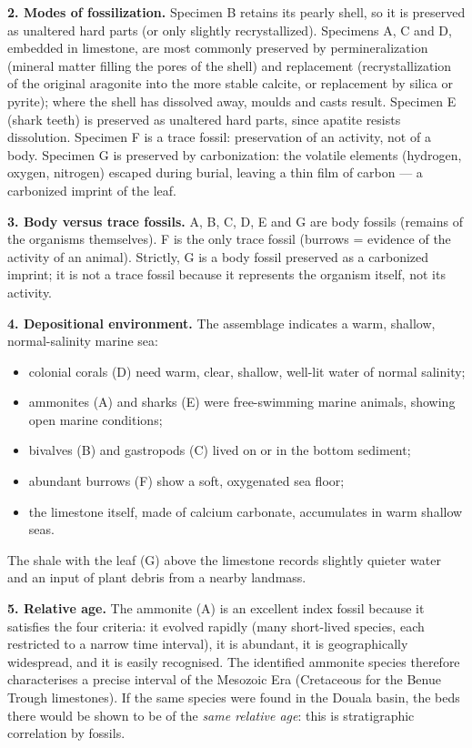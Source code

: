 \documentclass[11pt]{article}
\newcommand{\cle}[1]{{\popxbold\color{popdark}#1}}
\begin{document}
\textbf{2. Modes of fossilization.} Specimen B retains its pearly shell, so it is preserved as \cle{unaltered hard parts} (or only slightly recrystallized). Specimens A, C and D, embedded in limestone, are most commonly preserved by \cle{permineralization} (mineral matter filling the pores of the shell) and \cle{replacement} (recrystallization of the original aragonite into the more stable calcite, or replacement by silica or pyrite); where the shell has dissolved away, \cle{moulds and casts} result. Specimen E (shark teeth) is preserved as unaltered hard parts, since apatite resists dissolution. Specimen F is a \cle{trace fossil}: preservation of an activity, not of a body. Specimen G is preserved by \cle{carbonization}: the volatile elements (hydrogen, oxygen, nitrogen) escaped during burial, leaving a thin film of carbon --- a carbonized imprint of the leaf.

\textbf{3. Body versus trace fossils.} A, B, C, D, E and G are \cle{body fossils} (remains of the organisms themselves). F is the only \cle{trace fossil} (burrows = evidence of the activity of an animal). Strictly, G is a body fossil preserved as a carbonized imprint; it is not a trace fossil because it represents the organism itself, not its activity.

\textbf{4. Depositional environment.} The assemblage indicates a \cle{warm, shallow, normal-salinity marine sea}:
\begin{itemize}
\item colonial corals (D) need warm, clear, shallow, well-lit water of normal salinity;
\item ammonites (A) and sharks (E) were free-swimming marine animals, showing open marine conditions;
\item bivalves (B) and gastropods (C) lived on or in the bottom sediment;
\item abundant burrows (F) show a soft, oxygenated sea floor;
\item the limestone itself, made of calcium carbonate, accumulates in warm shallow seas.
\end{itemize}
The shale with the leaf (G) above the limestone records slightly quieter water and an input of plant debris from a nearby landmass.

\textbf{5. Relative age.} The ammonite (A) is an excellent \cle{index fossil} because it satisfies the four criteria: it evolved rapidly (many short-lived species, each restricted to a narrow time interval), it is abundant, it is geographically widespread, and it is easily recognised. The identified ammonite species therefore characterises a precise interval of the Mesozoic Era (Cretaceous for the Benue Trough limestones). If the same species were found in the Douala basin, the beds there would be shown to be of the \emph{same relative age}: this is \cle{stratigraphic correlation} by fossils.
\end{document}
